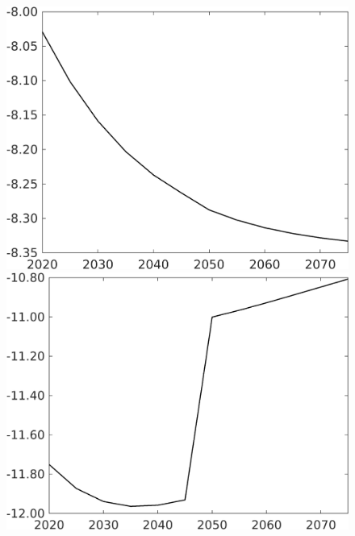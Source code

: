 \documentclass[12pt]{article}
\begin{document}
\begin{figure}[h!!]
\begin{minipage}[]{0.32\textwidth}
	\end{minipage}
	\begin{minipage}[]{0.32\textwidth}
		\includegraphics[width=1\textwidth]{../../codding_model/own_basedOnFried/optimalPol_010922_revision/figures/all_13Sept22/CompTaufPER_bytaul_Equlab_Reg0_Ln_spillover0_nsk0_xgr0_knspil1_sep1_LFlimit1_emsbase0_countec0_GovRev0_etaa0.79_lgd0.png}
	\end{minipage}			
	\begin{minipage}[]{0.32\textwidth}
		\includegraphics[width=1\textwidth]{../../codding_model/own_basedOnFried/optimalPol_010922_revision/figures/all_13Sept22/CompTaufPER_bytaul_Equlab_Reg0_GFF_spillover0_nsk0_xgr0_knspil1_sep1_LFlimit1_emsbase0_countec0_GovRev0_etaa0.79_lgd0.png}

\end{minipage}
\end{figure}
\end{document}
